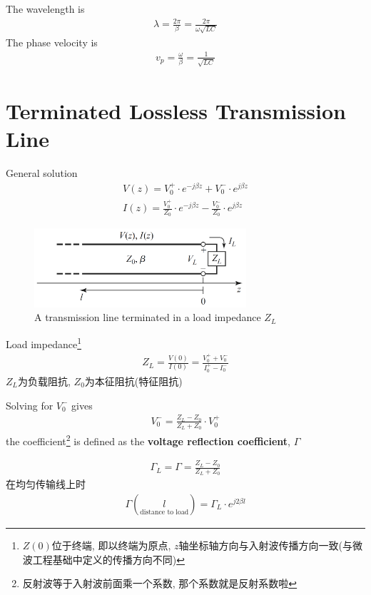 \documentclass[a4paper]{report}
\begin{document}
The wavelength is
\begin{align*}
  \lambda=\frac{2\pi}{\beta}=\frac{2\pi}{\omega\sqrt{LC}}
\end{align*}
The phase velocity is 
\begin{align*}
  v_p=\frac{\omega}{\beta}=\frac{1}{\sqrt{LC}}
\end{align*}
\section{Terminated Lossless Transmission Line}
General solution
\begin{align*}
  V(z)=V_0^+\cdot e^{-j\beta z}+V_0^-\cdot e^{j\beta z}
  \\I(z)=\frac{V_0^+}{Z_0}\cdot e^{-j\beta z}-\frac{V_0^-}{Z_0}\cdot e^{j\beta z}
\end{align*}
\begin{figure}[H]
\centering
\includegraphics[width=0.7\textwidth]{tl.png}
\caption{A transmission line terminated in a load impedance $Z_L$}
\end{figure}
Load impedance\footnote{$Z(0)$位于终端, 即以终端为原点, $z$轴坐标轴方向与入射波传播方向一致(与微波工程基础中定义的传播方向不同)} 
\begin{align*}
  Z_L=\frac{V(0)}{I(0)}=\frac{V_0^+ + V_0^-}{I_0^+ - I_0^-}
\end{align*}
$Z_L$为负载阻抗, $Z_0$为本征阻抗(特征阻抗)

Solving for $V_0^-$ gives
\begin{align*}
  V_0^-=\frac{Z_L-Z_0}{Z_L+Z_0}\cdot V_0^+
\end{align*}
the coefficient\footnote{反射波等于入射波前面乘一个系数, 那个系数就是反射系数啦} is defined as the \textbf{voltage reflection coefficient}, $\Gamma$

\begin{align}
  \Gamma_L=\Gamma=\frac{Z_L-Z_0}{Z_L+Z_0}
\end{align}
在均匀传输线上时
\begin{align*}
   \Gamma(\underset{\text{distance to load}}{l})=\Gamma_L\cdot e^{j2\beta l}
\end{align*}
\end{document}
